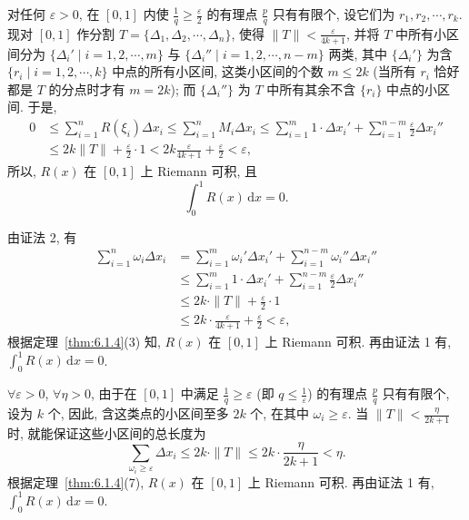 \begin{solution}[证法 2]
对任何 $\varepsilon>0$, 在 $[0,1]$ 内使 $\frac{1}{q}\geqslant\frac{\varepsilon}{2}$ 的有理点 $\frac{p}{q}$ 只有有限个, 设它们为 $r_{1},r_{2},\cdots,r_{k}$. 现对 $[0,1]$ 作分割 $T=\{\Delta_{1},\Delta_{2},\cdots,\Delta_{n}\}$, 使得 $\|T\|<\frac{\varepsilon}{4k+1}$, 并将 $T$ 中所有小区间分为 $\{\Delta_{i}'\mid i=1,2,\cdots,m\}$ 与 $\{\Delta_{i}''\mid i=1,2,\cdots,n-m\}$ 两类, 其中 $\{\Delta_{i}'\}$ 为含 $\{r_{i}\mid i=1,2,\cdots,k\}$ 中点的所有小区间, 这类小区间的个数 $m\leqslant 2k$ (当所有 $r_{i}$ 恰好都是 $T$ 的分点时才有 $m=2k$); 而 $\{\Delta_{i}''\}$ 为 $T$ 中所有其余不含 $\{r_{i}\}$ 中点的小区间. 于是,
\begin{align*}
0&\leqslant\sum_{i=1}^{n}R(\xi_{i})\Delta x_{i}\leqslant\sum_{i=1}^{n}M_{i}\Delta x_{i}\leqslant\sum_{i=1}^{m}1\cdot\Delta x_{i}'+\sum_{i=1}^{n-m}\frac{\varepsilon}{2}\Delta x_{i}''\\
&\leqslant 2k\|T\|+\frac{\varepsilon}{2}\cdot 1<2k\frac{\varepsilon}{4k+1}+\frac{\varepsilon}{2}<\varepsilon,
\end{align*}
所以, $R(x)$ 在 $[0,1]$ 上 Riemann 可积, 且
\[
\int_{0}^{1}R(x)\,\mathrm{d}x=0.
\]
\end{solution}

\begin{solution}[证法 3]
由证法 2, 有
\begin{align*}
\sum_{i=1}^{n}\omega_{i}\Delta x_{i}&=\sum_{i=1}^{m}\omega_{i}'\Delta x_{i}'+\sum_{i=1}^{n-m}\omega_{i}''\Delta x_{i}''\\
&\leqslant\sum_{i=1}^{m}1\cdot\Delta x_{i}'+\sum_{i=1}^{n-m}\frac{\varepsilon}{2}\Delta x_{i}''\\
&\leqslant 2k\cdot\|T\|+\frac{\varepsilon}{2}\cdot 1\\
&\leqslant 2k\cdot\frac{\varepsilon}{4k+1}+\frac{\varepsilon}{2}<\varepsilon,
\end{align*}
根据定理~\ref{thm:6.1.4}(3) 知, $R(x)$ 在 $[0,1]$ 上 Riemann 可积. 再由证法 1 有, $\int_{0}^{1}R(x)\,\mathrm{d}x=0$.
\end{solution}

\begin{solution}[证法 4]
$\forall\varepsilon>0$, $\forall\eta>0$, 由于在 $[0,1]$ 中满足 $\frac{1}{q}\geqslant\varepsilon$ (即 $q\leqslant\frac{1}{\varepsilon}$) 的有理点 $\frac{p}{q}$ 只有有限个, 设为 $k$ 个, 因此, 含这类点的小区间至多 $2k$ 个, 在其中 $\omega_{i}\geqslant\varepsilon$. 当 $\|T\|<\frac{\eta}{2k+1}$ 时, 就能保证这些小区间的总长度为
\[
\sum_{\omega_{i}\geqslant\varepsilon}\Delta x_{i}\leqslant 2k\cdot\|T\|\leqslant 2k\cdot\frac{\eta}{2k+1}<\eta.
\]
根据定理~\ref{thm:6.1.4}(7), $R(x)$ 在 $[0,1]$ 上 Riemann 可积. 再由证法 1 有, $\int_{0}^{1}R(x)\,\mathrm{d}x=0$.
\end{solution}

